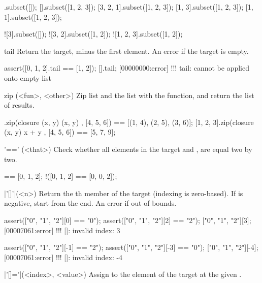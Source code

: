 \begin{urbiscriptapi}
\begin{urbiassert}
        [].subset([]);
        [].subset([1, 2, 3]);
 [3, 2, 1].subset([1, 2, 3]);
    [1, 3].subset([1, 2, 3]);
    [1, 1].subset([1, 2, 3]);

      ![3].subset([]);
   ![3, 2].subset([1, 2]);
![1, 2, 3].subset([1, 2]);
\end{urbiassert}

\item[tail]
  Return the target, minus the first element. An error if the target
  is empty.

\begin{urbiscript}
assert([0, 1, 2].tail == [1, 2]);
[].tail;
[00000000:error] !!! tail: cannot be applied onto empty list
\end{urbiscript}

\item[zip](<fun>, <other>)%
  Zip \this list and the  list with the  function, and
  return the list of results.

\begin{urbiassert}
[1, 2, 3].zip(closure (x, y) { (x, y) }, [4, 5, 6])
       == [(1, 4), (2, 5), (3, 6)];
[1, 2, 3].zip(closure (x, y) { x + y }, [4, 5, 6])
       == [5, 7, 9];
\end{urbiassert}

\item['=='](<that>)%
Check whether all elements in the target and , are
equal two by two.

\begin{urbiassert}
[0, 1, 2] == [0, 1, 2];
!([0, 1, 2] == [0, 0, 2]);
\end{urbiassert}

\item|'[]'|(<n>)%
  Return the th member of the target (indexing is
  zero-based). If  is negative, start from the end.  An error
  if out of bounds.

\begin{urbiscript}
assert(["0", "1", "2"][0] == "0");
assert(["0", "1", "2"][2] == "2");
["0", "1", "2"][3];
[00007061:error] !!! []: invalid index: 3

assert(["0", "1", "2"][-1] == "2");
assert(["0", "1", "2"][-3] == "0");
["0", "1", "2"][-4];
[00007061:error] !!! []: invalid index: -4
\end{urbiscript}

\item|'[]='|(<index>, <value>)%
  Assign  to the element of the target at the given
  .


\end{urbiscriptapi}
